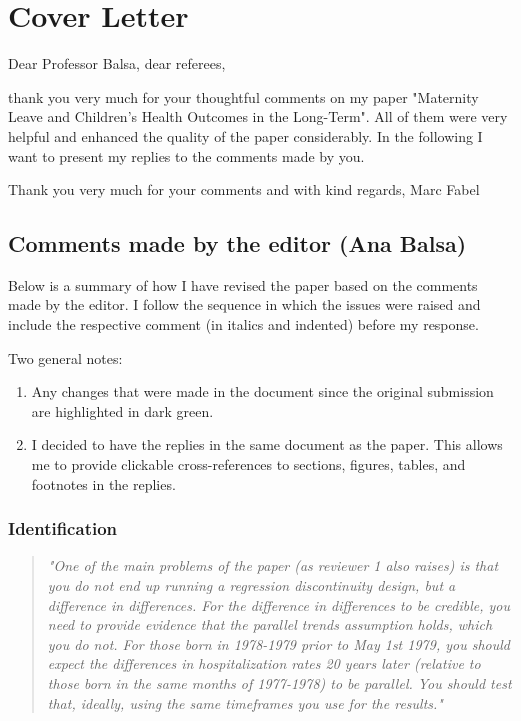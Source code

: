 \thispagestyle{empty}
\chapter*{Cover Letter}



Dear Professor Balsa, dear referees, 

thank you very much for your thoughtful comments on my paper "Maternity Leave and Children's Health Outcomes in the Long-Term". All of them were very helpful and enhanced the quality of the paper considerably. In the following I want to present my replies to the comments made by you. 



Thank you very much for your comments and with kind regards,
Marc Fabel 



\newpage
\section*{Comments made by the editor (Ana Balsa)}

Below is a summary of how I have revised the paper based on the comments made by the editor. I follow the sequence in which the issues were raised and include the respective comment (in italics and indented) before my response.

Two general notes:
\begin{enumerate}
	\item Any changes that were made in the document since the original submission are highlighted in dark green. 
	\item I decided to have the replies in the same document as the paper. This allows me to provide clickable cross-references to sections, figures, tables, and footnotes in the replies.
\end{enumerate}

\subsection*{Identification}

\begin{quote}
\textit{"One of the main problems of the paper (as reviewer 1 also raises) is that you do not end up running a regression discontinuity design, but a difference in differences. For the difference in differences to be credible, you need to provide evidence that the parallel trends assumption holds, which you do not. For those born in 1978-1979 prior to May 1st 1979, you should expect the differences in hospitalization rates 20 years later (relative to those born in the same months of 1977-1978) to be parallel. You should test that, ideally, using the same timeframes you use for the results."}
\end{quote}

